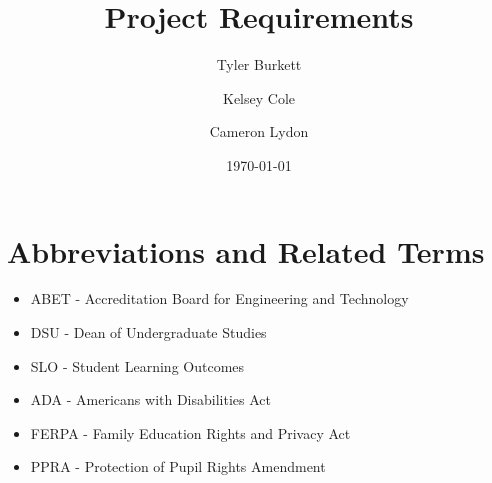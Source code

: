 \documentclass[a4paper,12pt]{article}
\begin{document}
\title{Project Requirements}
\author{ Tyler Burkett \\
	\and
	Kelsey Cole
	\and
	Cameron Lydon
	}
\date{\today}
\maketitle

\section*{Abbreviations and Related Terms}
\begin{itemize}
\item ABET - Accreditation Board for Engineering and Technology
\item DSU - Dean of Undergraduate Studies
\item SLO - Student Learning Outcomes
\item ADA - Americans with Disabilities Act
\item FERPA - Family Education Rights and Privacy Act 
\item PPRA - Protection of Pupil Rights Amendment
\end{itemize}

\end{document}
